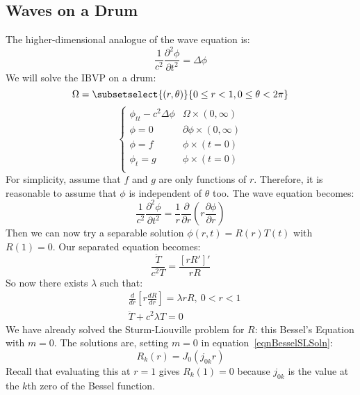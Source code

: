 \documentclass[../Main.tex]{subfiles}
\begin{document}
\subsection{Waves on a Drum}
The higher-dimensional analogue of the wave equation is:
\begin{equation}
    \frac{1}{c^2} \frac{\partial^{2}\phi}{\partial t^{2}} = \Delta \phi
    \label{eqnWave3D}
\end{equation}
We will solve the IBVP on a drum:
\begin{equation*}
    \Omega = \subsetselect{(r, \theta)}{0 \leq r < 1, 0 \leq \theta < 2\pi}
\end{equation*}
\begin{equation*}
    \begin{cases}
        \phi_{tt} - c^2 \Delta \phi & \Omega \times (0, \infty) \\
        \phi = 0 & \partial \phi \times (0, \infty) \\
        \phi = f & \phi \times (t = 0) \\
        \phi_t = g & \phi \times (t = 0) \\
    \end{cases}
\end{equation*}
For simplicity, assume that $f$ and $g$ are only functions of $r$. Therefore, it is reasonable to assume that $\phi$ is independent of $\theta$ too. The wave equation becomes:
\begin{equation*}
    \frac{1}{c^2} \frac{\partial^{2}\phi}{\partial t^{2}} = \frac{1}{r} \frac{\partial}{\partial r}\left(r \frac{\partial \phi}{\partial r}\right)
\end{equation*}
Then we can now try a separable solution $\phi(r, t) = R(r) T(t)$ with $R(1) = 0$. Our separated equation becomes:
\begin{equation*}
    \frac{\ddot{T}}{c^2 T} = \frac{[rR']'}{rR}
\end{equation*}
So now there exists $\lambda$ such that:
\begin{align*}
    &\frac{d}{dr}\left[r \frac{dR}{dr}\right] = \lambda rR,~0 < r < 1 \\
    &\ddot{T} + c^2 \lambda T = 0
\end{align*}
We have already solved the Sturm-Liouville problem for $R$: this Bessel's Equation with $m = 0$. The solutions are, setting $m = 0$ in equation~\ref{eqnBesselSLSoln}:
\begin{equation*}
    R_k(r) = J_{0}(j_{0k} r)
\end{equation*}
Recall that evaluating this at $r = 1$ gives $R_k(1) = 0$ because $j_{0k}$ is the value at the $k$th zero of the Bessel function.
\end{document}
